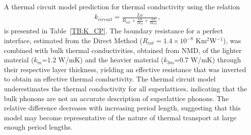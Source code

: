 A thermal circuit model prediction for thermal conductivity using the relation
\begin{equation}\label{EQ:TCircuit}
\begin{split}
k_{circuit}= \frac{La}{R_{int}+\frac{La}{2k_m}+\frac{La}{2k_{3m}}},
\end{split}
\end{equation}
is presented in Table~\ref{TB:K_CP}. The boundary resistance for a perfect interface, estimated from the Direct Method ($R_{int}=1.4\times10^{-8}$ Km$^2$W$^{-1}$), was combined with bulk thermal conductivities, obtained from NMD, of the lighter material ($k_{m}$=1.2 W/mK) and the heavier material ($k_{3m}$=0.7 W/mK) through their respective layer thickness, yielding an effective resistance that was inverted to obtain an effective thermal conductivity. The thermal circuit model underestimates the thermal conductivity for all superlattices, indicating that the bulk phonons are not an accurate description of superlattice phonons. The relative difference decreases with increasing period length, suggesting that this model may become representative of the nature of thermal transport at large enough period lengths.
